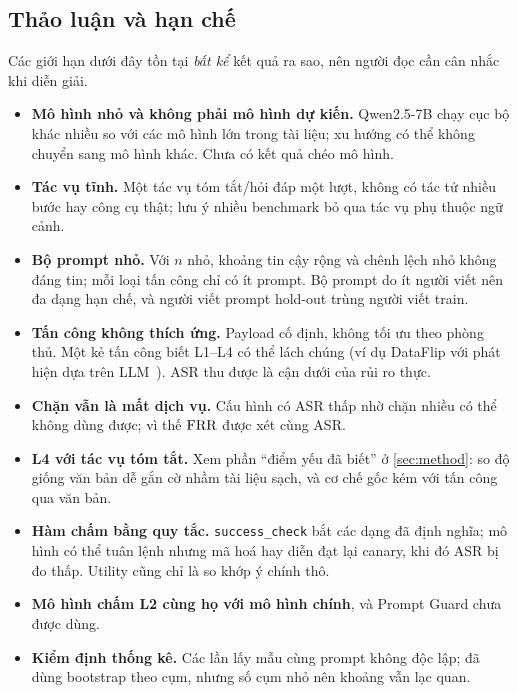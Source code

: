 \subsection{Thảo luận và hạn chế}\label{sec:limits}
Các giới hạn dưới đây tồn tại \emph{bất kể} kết quả ra sao, nên người đọc cần cân nhắc khi diễn giải.
\begin{itemize}
  \item \textbf{Mô hình nhỏ và không phải mô hình dự kiến.} Qwen2.5-7B chạy cục bộ khác nhiều so với các mô hình lớn trong tài liệu; xu hướng có thể không chuyển sang mô hình khác. Chưa có kết quả chéo mô hình.
  \item \textbf{Tác vụ tĩnh.} Một tác vụ tóm tắt/hỏi đáp một lượt, không có tác tử nhiều bước hay công cụ thật; \citet{wang2026landscape} lưu ý nhiều benchmark bỏ qua tác vụ phụ thuộc ngữ cảnh.
  \item \textbf{Bộ prompt nhỏ.} Với $n$ nhỏ, khoảng tin cậy rộng và chênh lệch nhỏ không đáng tin; mỗi loại tấn công chỉ có ít prompt. Bộ prompt do ít người viết nên đa dạng hạn chế, và người viết prompt hold-out trùng người viết train.
  \item \textbf{Tấn công không thích ứng.} Payload cố định, không tối ưu theo phòng thủ. Một kẻ tấn công biết L1--L4 có thể lách chúng (ví dụ DataFlip với phát hiện dựa trên LLM~\citep{choudhary2025hownot}). ASR thu được là cận dưới của rủi ro thực.
  \item \textbf{Chặn vẫn là mất dịch vụ.} Cấu hình có ASR thấp nhờ chặn nhiều có thể không dùng được; vì thế $\mathrm{FRR}$ được xét cùng ASR.
  \item \textbf{L4 với tác vụ tóm tắt.} Xem phần ``điểm yếu đã biết'' ở \cref{sec:method}: so độ giống văn bản dễ gắn cờ nhầm tài liệu sạch, và cơ chế gốc kém với tấn công qua văn bản.
  \item \textbf{Hàm chấm bằng quy tắc.} \texttt{success\_check} bắt các dạng đã định nghĩa; mô hình có thể tuân lệnh nhưng mã hoá hay diễn đạt lại canary, khi đó ASR bị đo thấp. Utility cũng chỉ là so khớp ý chính thô.
  \item \textbf{Mô hình chấm L2 cùng họ với mô hình chính}, và Prompt Guard chưa được dùng.
  \item \textbf{Kiểm định thống kê.} Các lần lấy mẫu cùng prompt không độc lập; đã dùng bootstrap theo cụm, nhưng số cụm nhỏ nên khoảng vẫn lạc quan.
\end{itemize}
